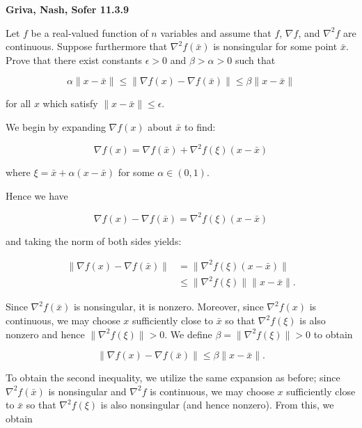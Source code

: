 \textbf{Griva, Nash, Sofer 11.3.9}

Let $f$ be a real-valued function of $n$ variables and assume that $f$, $\nabla f$, and $\nabla^2 f$ are continuous.
Suppose furthermore that $\nabla^2 f(\bar{x})$ is nonsingular for some point $\bar{x}$. Prove that there exist constants
$\epsilon > 0$ and $\beta > \alpha > 0$ such that

$$
\alpha \lVert x - \bar{x} \rVert \le \lVert \nabla f(x) - \nabla f(\bar{x}) \rVert \le \beta \lVert x - \bar{x} \rVert 
$$

for all $x$ which satisfy $\lVert x - \bar{x} \rVert \le \epsilon$.

\begin{solution}
    We begin by expanding $\nabla f(x)$ about $\bar{x}$ to find:

    $$
    \nabla f(x) = \nabla f(\bar{x}) + \nabla^2 f(\xi)(x - \bar{x})
    $$

    where $\xi = \bar{x} + \alpha (x - \bar{x})$ for some $\alpha \in (0, 1)$.

    Hence we have 

    $$
    \nabla f(x) - \nabla f(\bar{x}) = \nabla^2 f(\xi)(x - \bar{x})
    $$

    and taking the norm of both sides yields:

    \begin{align*}
        \lVert \nabla f(x) - \nabla f(\bar{x}) \rVert &= \lVert \nabla^2 f(\xi)(x - \bar{x}) \rVert \\
                                                      &\le \lVert \nabla^2 f(\xi) \rVert \lVert x - \bar{x} \rVert.
    \end{align*}

    Since $\nabla^2 f(\bar{x})$ is nonsingular, it is nonzero. Moreover, since $\nabla^2 f(x)$ is continuous, we may 
    choose $x$ sufficiently close to $\bar{x}$ so that $\nabla^2 f(\xi)$ is also nonzero and hence \linebreak
    $\lVert \nabla^2 f(\xi) \rVert > 0$. We define $\beta = \lVert \nabla^2 f(\xi) \rVert > 0$ to obtain

    $$
    \lVert \nabla f(x) - \nabla f(\bar{x}) \rVert \le \beta \lVert x - \bar{x} \rVert.
    $$

    To obtain the second inequality, we utilize the same expansion as before; since $\nabla^2 f(\bar{x})$ is nonsingular
    and $\nabla^2 f$ is continuous, we may choose $x$ sufficiently close to $\bar{x}$ so that $\nabla^2 f(\xi)$ is also
    nonsingular (and hence nonzero). From this, we obtain


\end{solution}
